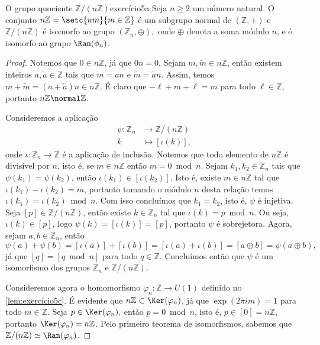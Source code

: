 \begin{proposition}{O grupo quociente \(\mathbb{Z}/(n \mathbb{Z})\)}{exercício5a}
    Seja \(n \geq 2\) um número natural. O conjunto \(n \mathbb{Z} = \setc{nm}{m \in \mathbb{Z}}\) é um subgrupo normal de \((\mathbb{Z}, +)\) e \(\mathbb{Z}/(n \mathbb{Z})\) é isomorfo ao grupo \((\mathbb{Z}_n, \oplus),\) onde \(\oplus\) denota a soma módulo \(n\), e é isomorfo ao grupo \(\Ran(\phi_n)\).
\end{proposition}
\begin{proof}
    Notemos que \(0 \in n \mathbb{Z}\), já que \(0n = 0.\) Sejam \(m, \tilde{m} \in n \mathbb{Z}\), então existem inteiros \(a, \tilde{a} \in \mathbb{Z}\) tais que \(m = a n\) e \(\tilde{m} = \tilde{a}n\). Assim, temos \(m + \tilde{m} = (a+\tilde{a})n \in n \mathbb{Z}\). É claro que \(- \ell + m + \ell = m\) para todo \(\ell \in \mathbb{Z}\), portanto \(n \mathbb{Z} \normal \mathbb{Z}\).

    Consideremos a aplicação
    \begin{align*}
        \psi : \mathbb{Z}_n &\to \mathbb{Z}/(n \mathbb{Z})\\
                          k &\mapsto [\iota(k)],
    \end{align*}
    onde \(\iota : \mathbb{Z}_n \to \mathbb{Z}\) é a aplicação de inclusão. Notemos que todo elemento de \(n \mathbb{Z}\) é divisível por \(n\), isto é, se \(m \in n \mathbb{Z}\) então \(m =0 \bmod n\). Sejam \(k_1, k_2 \in \mathbb{Z}_n\) tais que \(\psi(k_1) = \psi(k_2)\), então \(\iota(k_1) \in [\iota(k_2)]\). Isto é, existe \(m \in n\mathbb{Z}\) tal que \(\iota(k_1) - \iota(k_2) = m\), portanto tomando o módulo \(n\) desta relação temos \(\iota(k_1) = \iota(k_2) \bmod n\). Com isso concluímos que \(k_1 = k_2\), isto é, \(\psi\) é injetiva. Seja \([p] \in \mathbb{Z}/(n \mathbb{Z})\), então existe \(k \in \mathbb{Z}_n\) tal que \(\iota(k) = p \bmod n\). Ou seja, \(\iota(k) \in [p]\), logo \(\psi(k) = [\iota(k)] = [p]\), portanto \(\psi\) é sobrejetora. Agora, sejam \(a, b \in \mathbb{Z}_n\), então
    \begin{equation*}
        \psi(a) + \psi(b) = [\iota(a)] + [\iota(b)] = [\iota(a) + \iota(b)] = [a \oplus b] = \psi(a \oplus b),
    \end{equation*}
    já que \([q] = [q \bmod n]\) para todo \(q \in \mathbb{Z}\). Concluímos então que \(\psi\) é um isomorfismo dos grupos \(\mathbb{Z}_n\) e \(\mathbb{Z}/(n \mathbb{Z})\).

    Consideremos agora o homomorfismo \(\varphi_n : \mathbb{Z} \to U(1)\) definido no \cref{lem:exercício5c}. É evidente que \(n \mathbb{Z} \subset \Ker(\varphi_n)\), já que \(\exp(2\pi i m) = 1\) para todo \(m \in \mathbb{Z}\). Seja \(p \in \Ker(\varphi_n),\) então \(p = 0 \bmod n\), isto é, \(p \in [0] = n \mathbb{Z}\), portanto \(\Ker(\varphi_n) = n \mathbb{Z}\). Pelo primeiro teorema de isomorfismos, sabemos que \(\mathbb{Z}/(n \mathbb{Z}) \simeq \Ran(\varphi_n)\).
\end{proof}
